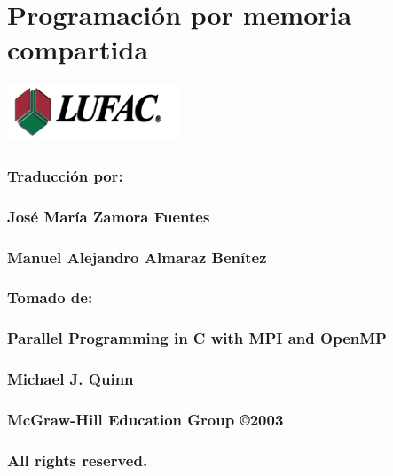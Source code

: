 \documentclass[12pt,letterpaper]{book}
\begin{document}
\frontmatter
%
\chapter*{\Huge \center Programación por memoria compartida }
\thispagestyle{empty}
{\hspace{2in} \includegraphics{../imagenes/logo_lufac.png} }
\newpage
\subsection*{\center \normalsize Traducción por:}
\subsection*{\center \normalsize José María Zamora Fuentes}
\subsection*{\center \normalsize Manuel Alejandro Almaraz Benítez }
\subsection*{\center \normalsize Tomado de:}
\subsection*{\center \normalsize Parallel Programming in C with MPI and OpenMP}
\subsection*{\center \normalsize Michael J. Quinn}
\subsection*{\center \normalsize McGraw-Hill Education Group \copyright 2003 }
\subsection*{\center \normalsize All rights reserved.}
\end{document}
